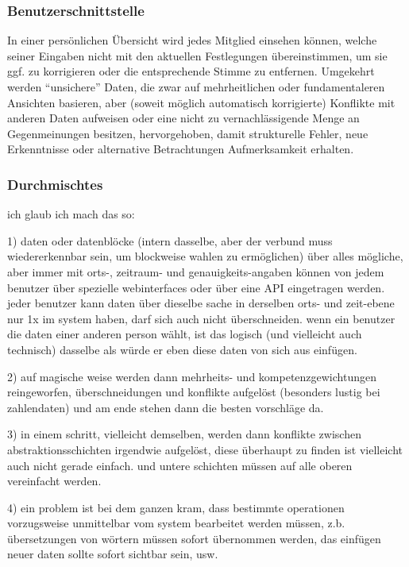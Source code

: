 \subsubsection{Benutzerschnittstelle}

In einer persönlichen Übersicht wird jedes Mitglied einsehen können, welche seiner Eingaben nicht mit den aktuellen Festlegungen übereinstimmen, um sie ggf. zu korrigieren oder die entsprechende Stimme zu entfernen. Umgekehrt werden "`unsichere"' Daten, die zwar auf mehrheitlichen oder fundamentaleren Ansichten basieren, aber (soweit möglich automatisch korrigierte) Konflikte mit anderen Daten aufweisen oder eine nicht zu vernachlässigende Menge an Gegenmeinungen besitzen, hervorgehoben, damit strukturelle Fehler, neue Erkenntnisse oder alternative Betrachtungen Aufmerksamkeit erhalten.

\subsubsection{Durchmischtes}

ich glaub ich mach das so:

1) daten oder datenblöcke (intern dasselbe, aber der verbund muss wiedererkennbar sein, um blockweise wahlen zu ermöglichen) über alles mögliche, aber immer mit orts-, zeitraum- und genauigkeits-angaben können von jedem benutzer über spezielle webinterfaces oder über eine API eingetragen werden. jeder benutzer kann daten über dieselbe sache in derselben orts- und zeit-ebene nur 1x im system haben, darf sich auch nicht überschneiden. wenn ein benutzer die daten einer anderen person wählt, ist das logisch (und vielleicht auch technisch) dasselbe als würde er eben diese daten von sich aus einfügen.

2) auf magische weise werden dann mehrheits- und kompetenzgewichtungen reingeworfen, überschneidungen und konflikte aufgelöst (besonders lustig bei zahlendaten) und am ende stehen dann die besten vorschläge da.

3) in einem schritt, vielleicht demselben, werden dann konflikte zwischen abstraktionsschichten irgendwie aufgelöst, diese überhaupt zu finden ist vielleicht auch nicht gerade einfach. und untere schichten müssen auf alle oberen vereinfacht werden.

4) ein problem ist bei dem ganzen kram, dass bestimmte operationen vorzugsweise unmittelbar vom system bearbeitet werden müssen, z.b. übersetzungen von wörtern müssen sofort übernommen werden, das einfügen neuer daten sollte sofort sichtbar sein, usw.

